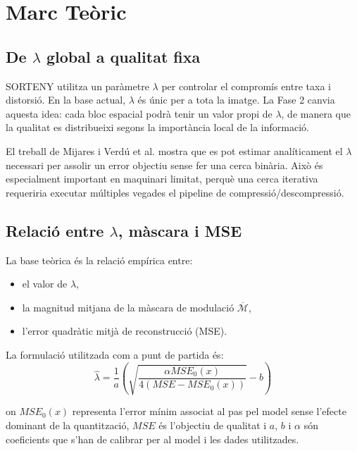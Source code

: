 \documentclass[11pt,a4paper]{article}
\begin{document}
\section{Marc Teòric}

\subsection{De $\lambda$ global a qualitat fixa}

SORTENY utilitza un paràmetre $\lambda$ per controlar el compromís entre taxa i distorsió. En la base actual, $\lambda$ és únic per a tota la imatge. La Fase 2 canvia aquesta idea: cada bloc espacial podrà tenir un valor propi de $\lambda$, de manera que la qualitat es distribueixi segons la importància local de la informació.

El treball de Mijares i Verdú et al. \cite{mijares2024fixed} mostra que es pot estimar analíticament el $\lambda$ necessari per assolir un error objectiu sense fer una cerca binària. Això és especialment important en maquinari limitat, perquè una cerca iterativa requeriria executar múltiples vegades el pipeline de compressió/descompressió.

\subsection{Relació entre $\lambda$, màscara i MSE}

La base teòrica és la relació empírica entre:
\begin{itemize}
  \item el valor de $\lambda$,
  \item la magnitud mitjana de la màscara de modulació $\overline{\mathcal{M}}$,
  \item l'error quadràtic mitjà de reconstrucció (MSE).
\end{itemize}

La formulació utilitzada com a punt de partida és:
\begin{equation}
  \hat{\lambda} =
  \frac{1}{a}
  \left(
    \sqrt{
      \frac{\alpha MSE_0(x)}
      {4(MSE - MSE_0(x))}
    }
    - b
  \right)
\end{equation}

on $MSE_0(x)$ representa l'error mínim associat al pas pel model sense l'efecte dominant de la quantització, $MSE$ és l'objectiu de qualitat i $a$, $b$ i $\alpha$ són coeficients que s'han de calibrar per al model i les dades utilitzades.
\end{document}
